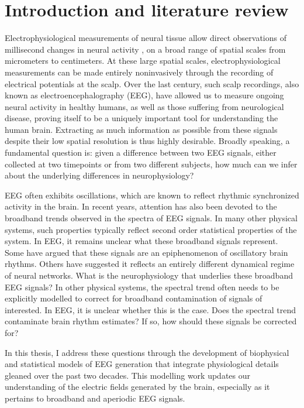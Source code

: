 \chapter{Introduction and literature review}

Electrophysiological measurements of neural tissue allow direct observations of millisecond changes in neural activity \cite{Donoghue2020}, on a broad range of spatial scales from micrometers to centimeters. At these large spatial scales, electrophysiological measurements can be made entirely noninvasively through the recording of electrical potentials at the scalp. Over the last century, such scalp recordings, also known as electroencephalography (EEG), have allowed us to measure ongoing neural activity in healthy humans, as well as those suffering from neurological disease, proving itself to be a uniquely important tool for understanding the human brain. Extracting as much information as possible from these signals despite their low spatial resolution is thus highly desirable. Broadly speaking, a fundamental question is: given a difference between two EEG signals, either collected at two timepoints or from two different subjects, how much can we infer about the underlying differences in neurophysiology? 

EEG often exhibits oscillations, which are known to reflect rhythmic synchronized activity in the brain. In recent years, attention has also been devoted to the broadband trends observed in the spectra of EEG signals. In many other physical systems, such properties typically reflect second order statistical properties of the system. In EEG, it remains unclear what these broadband signals represent. Some have argued that these signals are an epiphenomenon of oscillatory brain rhythms. Others have suggested it reflects an entirely different dynamical regime of neural networks. What is the neurophysiology that underlies these broadband EEG signals? In other physical systems, the spectral trend often needs to be explicitly modelled to correct for broadband contamination of signals of interested. In EEG, it is unclear whether this is the case. Does the spectral trend contaminate brain rhythm estimates? If so, how should these signals be corrected for?

In this thesis, I address these questions through the development of biophysical and statistical models of EEG generation that integrate physiological details gleaned over the past two decades. This modelling work updates our understanding of the electric fields generated by the brain, especially as it pertains to broadband and aperiodic EEG signals. 



